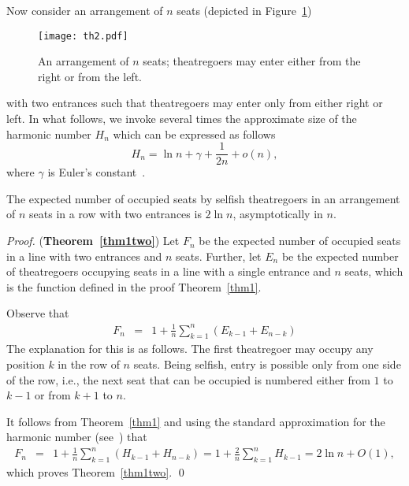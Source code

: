 \documentclass[11pt]{llncs}
\begin{document}
Now consider an arrangement of $n$ seats
(depicted in Figure~\ref{fig:th2})
\begin{figure}[!htb]
\begin{center}
\texttt{[image: th2.pdf]}\end{center}
\caption{An arrangement of $n$ seats; theatregoers may enter either from the right
or from the left.}
\label{fig:th2}
\end{figure}
with two entrances
such that 
theatregoers may enter only from either right or left.
In what follows, we invoke several times the approximate size of 
the harmonic number $H_n$ which can be expressed as follows
$$
H_n = \ln n + \gamma + \frac{1}{2n} + o (n),
$$
where $\gamma$ is Euler's constant~\cite{knuth}.

\begin{theorem}
\label{thm1two}
The expected number of occupied seats by selfish theatregoers
in an arrangement of $n$ seats
in a row with two entrances is $2 \ln n$, 
asymptotically in $n$.
\end{theorem}





\begin{proof}({\bf Theorem~\ref{thm1two}})
Let $F_n$ be the expected number of occupied seats
in a line with two entrances and $n$ seats.
Further, let $E_n$ be the expected number of theatregoers occupying seats 
in a line with a single entrance and $n$ seats, which is
the function defined
in the proof Theorem~\ref{thm1}.

Observe that 
\begin{eqnarray}
F_n &=& \label{maineq2}
1 + \frac{1}{n} \sum_{k=1}^n (E_{k-1} + E_{n-k})
\end{eqnarray}
The explanation for this is as follows. 
The first theatregoer may occupy any position
$k$ in the row of $n$ seats.
Being selfish, entry is possible only 
from one side of the row, i.e., the next seat that
can be occupied is numbered either
from $1$ to $k-1$ or from $k+1$ to $n$.  

It follows from Theorem~\ref{thm1} and using the standard approximation
for the harmonic number (see~\cite{knuth}) that
\begin{eqnarray*}
F_n &=&
1 + \frac{1}{n} \sum_{k=1}^n (H_{k-1} + H_{n-k})
=
1 + \frac{2}{n} \sum_{k=1}^n H_{k-1} 
=
2 \ln n + O(1),
\end{eqnarray*}
which proves Theorem~\ref{thm1two}.
\qed
\end{proof}
\end{document}
